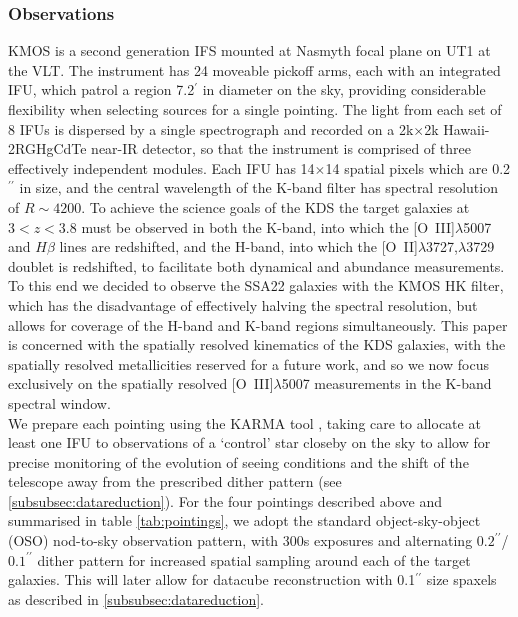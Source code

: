 \documentclass[fleqn,usenatbib]{mn2e}
\begin{document}
\subsubsection{Observations}\label{subsubsec:Obs}
KMOS is a second generation IFS mounted at Nasmyth focal plane on UT1 at the VLT.
The instrument has 24 moveable pickoff arms, each with an integrated IFU, which patrol a region 7.2$^{\prime}$ in diameter on the sky, providing considerable flexibility when selecting sources for a single pointing.
The light from each set of 8 IFUs is dispersed by a single spectrograph and recorded on a 2k$\times$2k Hawaii-2RGHgCdTe near-IR detector, so that the instrument is comprised of three effectively independent modules.
Each IFU has 14$\times$14 spatial pixels which are 0.2$^{\prime\prime}$ in size, and the central wavelength of the K-band filter has spectral resolution of $R \sim 4200$.
To achieve the science goals of the KDS the target galaxies at $3 < z < 3.8$ must be observed in both the K-band, into which the [O~{\sc III}]$\lambda$5007 and $H\beta$ lines are redshifted, and the H-band, into which the [O~{\sc II}]$\lambda$3727,$\lambda$3729 doublet is redshifted, to facilitate both dynamical and abundance measurements.
To this end we decided to observe the SSA22 galaxies with the KMOS HK filter, which has the disadvantage of effectively halving the spectral resolution, but allows for coverage of the H-band and K-band regions simultaneously.
This paper is concerned with the spatially resolved kinematics of the KDS galaxies, with the spatially resolved metallicities reserved for a future work, and so we now focus exclusively on the spatially resolved [O~{\sc III}]$\lambda$5007 measurements in the K-band spectral window. \\

We prepare each pointing using the KARMA tool \citep{Wegner2008}, taking care to allocate at least one IFU to observations of a `control' star closeby on the sky to allow for precise monitoring of the evolution of seeing conditions and the shift of the telescope away from the prescribed dither pattern (see \cref{subsubsec:datareduction}).
For the four pointings described above and summarised in table \ref{tab:pointings}, we adopt the standard object-sky-object (OSO) nod-to-sky observation pattern, with 300s exposures and alternating $0.2^{\prime\prime}$/$0.1^{\prime\prime}$ dither pattern for increased spatial sampling around each of the target galaxies.
This will later allow for datacube reconstruction with 0.1$^{\prime\prime}$ size spaxels as described in \cref{subsubsec:datareduction}. \\
\end{document}

